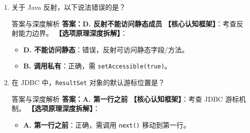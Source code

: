 ﻿\documentclass[12pt, a4paper]{ctexart}
\newcommand{\code}[1]{\texttt{#1}}
\begin{document}
\begin{enumerate}[label=\arabic*., itemsep=1.5em]
	\item 关于 Java 反射，以下说法错误的是？
	      \begin{bluebox}{答案与深度解析}
		      \textbf{答案：D. 反射不能访问静态成员}
		      \textbf{【核心认知框架】}：考查反射能力边界。
		      \textbf{【选项原理深度拆解】}：
		      \begin{itemize}[leftmargin=*, nosep]
			      \item \textbf{D. 不能访问静态}：错误，反射可访问静态字段/方法。
			      \item \textbf{B. 调用私有}：正确，需 \code{setAccessible(true)}。
		      \end{itemize}
	      \end{bluebox}

	\item 在 JDBC 中，\code{ResultSet} 对象的默认游标位置是？
	      \begin{bluebox}{答案与深度解析}
		      \textbf{答案：A. 第一行之前}
		      \textbf{【核心认知框架】}：考查 JDBC 游标机制。
		      \textbf{【选项原理深度拆解】}：
		      \begin{itemize}[leftmargin=*, nosep]
			      \item \textbf{A. 第一行之前}：正确，需调用 \code{next()} 移动到第一行。
		      \end{itemize}
	      \end{bluebox}


\end{enumerate}
\end{document}

